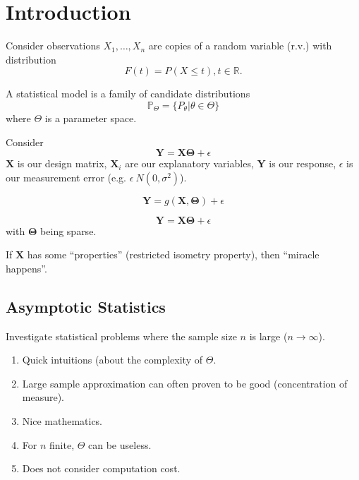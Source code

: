 \chapter{Introduction}
\label{cha:introduction}

Consider observations $X_{1}, \dots, X_{n}$ are copies of a random
variable (r.v.) with distribution $$F(t) = P(X \leq t), t \in
\mathbb{R}.$$

\begin{defn}
  A statistical model is a family of candidate distributions 
  $$\mathbb{P}_{\Theta} = \{ P_{\theta} | \theta \in \Theta \}$$ where
  $\Theta$ is a parameter space.
\end{defn}
\begin{exmp}
  Consider
  \begin{equation}
    \label{eq:1}
    \mathbf{Y} = \mathbf{X \Theta} + \epsilon
  \end{equation}
  $\mathbf{X}$ is our design matrix, $\mathbf{X}_{i}$ are our
  explanatory variables, $\mathbf{Y}$ is our response, $\epsilon$ is
  our measurement error (e.g. $\epsilon ~ N(0, \sigma^{2})$).
\end{exmp}


\begin{exmp}
  \begin{equation}
    \label{eq:2}
    \mathbf{Y} = g(\mathbf{X}, \mathbf{\Theta}) + \epsilon
  \end{equation}
\end{exmp}

\begin{exmp}
  \begin{equation}
    \label{eq:3}
    \mathbf{Y} = \mathbf{X \Theta} + \epsilon
  \end{equation}
  with $\mathbf{\Theta}$ being sparse.

  If $\mathbf{X}$ has some ``properties'' (restricted isometry property), then ``miracle happens''.
\end{exmp}

\section{Asymptotic Statistics}
\label{sec:asympt-stat}

Investigate statistical problems where the sample size $n$ is large
($n \rightarrow \infty$).
\begin{enumerate}
\item Quick intuitions (about the complexity of $\Theta$.
\item Large sample approximation can often proven to be good
  (concentration of measure).
\item Nice mathematics.
\item For $n$ finite, $\Theta$ can be useless.
\item Does not consider computation cost.
\end{enumerate}

